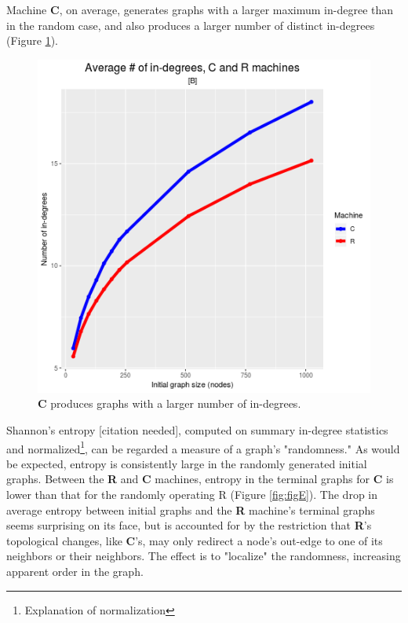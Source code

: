 \documentclass[twoside,twocolumn]{article}
\begin{document}
Machine \textbf{C}, on average, generates graphs with a larger 
maximum in-degree than in the random case, and also produces a
larger number of distinct in-degrees (Figure \ref{fig:figB}).

\begin{figure}
  \includegraphics[width=\linewidth, scale=0.7]{figB.png}
  \caption{\textbf{C} produces graphs with a larger number of in-degrees.}
  \label{fig:figB}
\end{figure}

Shannon's entropy [citation needed], computed on summary in-degree statistics and
normalized\footnote{Explanation of normalization}, can be regarded a measure of
a graph's "randomness."
As would be expected, entropy is consistently large in the randomly generated
initial graphs. Between the \textbf{R} and \textbf{C} machines, entropy in the terminal
graphs for \textbf{C} is lower than that for the randomly operating R (Figure \ref{fig:figE}).
The drop in average entropy between initial graphs and the \textbf{R} machine's terminal
graphs seems surprising on its face, but is accounted for by the restriction that
\textbf{R}'s topological changes, like \textbf{C}'s, may only redirect a node's out-edge
to one of its neighbors or their neighbors.
The effect is to "localize" the randomness, increasing apparent order in the graph.
\end{document}
